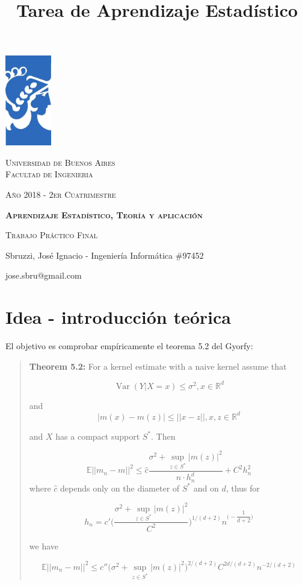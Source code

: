 \documentclass[12pt, a4paper]{article}
\title{Tarea de Aprendizaje Estadístico}
\author{}
\date{}
\begin{document}
\begin{titlepage} %
	\centering
	  \includegraphics[width=0.15\textwidth]{FIUBA_logo}\par
	  {\scshape\Large Universidad de Buenos Aires
      \\ Facultad de Ingenieria \par}
      {\scshape\small Año 2018 - 2er Cuatrimestre \par}
	  \vspace{1cm}
	  {\scshape\bfseries\LARGE Aprendizaje Estadístico, Teoría y aplicación\par}
	  \vspace{0.5cm}
	  \vspace{1cm}
      {\scshape\large Trabajo Práctico Final \par}
      \vspace{0.5cm
      \raggedright}
      \vspace{0.5cm}
    \centering
	  {\normalsize Sbruzzi, José Ignacio - Ingeniería Informática \#97452 \par}
      {\small  jose.sbru@gmail.com \par}
\end{titlepage} %
\newpage
\tableofcontents
\newpage
\section{Idea - introducción teórica}
El objetivo es comprobar empíricamente el teorema 5.2 del Gyorfy:

\begin{quotation}
\textbf{Theorem  5.2:} For a kernel estimate with a naive kernel assume that

$$
\mathop{Var}(Y|X=x)\leq \sigma^2 ,x \in \mathds{R}^d
$$

and
$$
|m(x)-m(z)|\leq||x-z||, x,z \in \mathds{R}^d
$$

and $X$ has a compact support $S^{*}$. Then

$$
\mathds{E}|| m_n -m ||^2 \leq \hat{c} \dfrac{ \sigma^2 + \mathop{sup}_{z\in S^{*}} |m(z)|^2 }{n \cdot h_n^d} +C^2h_n^2
$$
where $\hat{c}$ depends only on the diameter of $S^{*}$ and on $d$, thus for

$$
h_n = c' \Bigg( \dfrac{\sigma^2 + \mathop{sup}_{z\in S^{*}}|m(z)|^2 }{C^2} \Bigg)^{1/(d+2)} n^{\Big (-\dfrac{1}{d+2}\Big )}
$$

we have

$$
\mathds{E}|| m_n - m ||^2 \leq c'' \Bigg (  \sigma^2 + \mathop{sup}_{z\in S^{*}} |m(z)|^2 \Bigg )^{2/(d+2)} C^{2d/(d+2)} n^{-2/(d+2)}
$$

\end{quotation}
\end{document}
